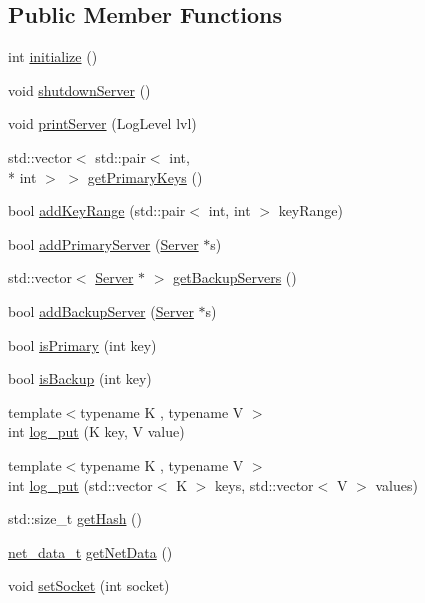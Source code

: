 \subsection*{Public Member Functions}
\begin{DoxyCompactItemize}
\item 
int \hyperlink{classServer_ae94d08657f48a3b51b411463f1137375}{initialize} ()
\item 
void \hyperlink{classServer_a4ce7fd6ac1a1f940db29e57f5f33ae9b}{shutdown\-Server} ()
\item 
void \hyperlink{classServer_aafbaecfe9f27c9eeb811a1bfde5e6c2e}{print\-Server} (Log\-Level lvl)
\item 
std\-::vector$<$ std\-::pair$<$ int, \\*
int $>$ $>$ \hyperlink{classServer_ad303d839086eee11137e6fc4a4bb95ab}{get\-Primary\-Keys} ()
\item 
bool \hyperlink{classServer_a395d7cb7194064c961710663926e4a3d}{add\-Key\-Range} (std\-::pair$<$ int, int $>$ key\-Range)
\item 
bool \hyperlink{classServer_a2f865f52beecb3be03eda85b4dc64e3e}{add\-Primary\-Server} (\hyperlink{classServer}{Server} $\ast$s)
\item 
std\-::vector$<$ \hyperlink{classServer}{Server} $\ast$ $>$ \hyperlink{classServer_a71a34c248da1cb74f3453f06223a606e}{get\-Backup\-Servers} ()
\item 
bool \hyperlink{classServer_ab272570a3b1d8eb7f9037c9e7b4e5f2a}{add\-Backup\-Server} (\hyperlink{classServer}{Server} $\ast$s)
\item 
bool \hyperlink{classServer_a9bd7a3b2b12f2f5bddd68eb245111d02}{is\-Primary} (int key)
\item 
bool \hyperlink{classServer_a66708ca0f53116a15258353cc60d1fd4}{is\-Backup} (int key)
\item 
{\footnotesize template$<$typename K , typename V $>$ }\\int \hyperlink{classServer_afb4289a5db1c23ac566dbb085a8f91fb}{log\-\_\-put} (K key, V value)
\item 
{\footnotesize template$<$typename K , typename V $>$ }\\int \hyperlink{classServer_ae419ba1245066b80f42302bb0c86ed00}{log\-\_\-put} (std\-::vector$<$ K $>$ keys, std\-::vector$<$ V $>$ values)
\item 
std\-::size\-\_\-t \hyperlink{classServer_adecf34082977620ca31ca8eab317cf6d}{get\-Hash} ()
\item 
\hyperlink{structnet__data__t}{net\-\_\-data\-\_\-t} \hyperlink{classServer_a6cb0d3961a37e1223b25f83b10844f3e}{get\-Net\-Data} ()
\item 
void \hyperlink{classServer_a369a1c0713310bf367b20e69259ac507}{set\-Socket} (int socket)
\end{DoxyCompactItemize}

